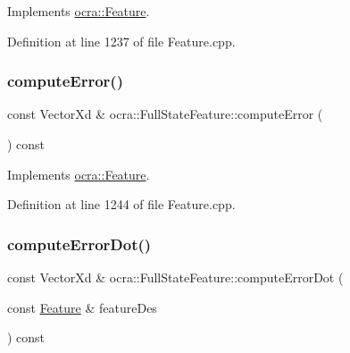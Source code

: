 Implements \hyperlink{classocra_1_1Feature_aaa74d6869f7e574fcc39d443581ddf77}{ocra\+::\+Feature}.



Definition at line 1237 of file Feature.\+cpp.

\hypertarget{classocra_1_1FullStateFeature_a8a8e1a72f3aa7b417b5d347eaee69ebb}{}\label{classocra_1_1FullStateFeature_a8a8e1a72f3aa7b417b5d347eaee69ebb} 
\subsubsection{\texorpdfstring{compute\+Error()}{computeError()}\hspace{0.1cm}{\footnotesize\ttfamily [2/2]}}
{\footnotesize\ttfamily const Vector\+Xd \& ocra\+::\+Full\+State\+Feature\+::compute\+Error (\begin{DoxyParamCaption}{ }\end{DoxyParamCaption}) const\hspace{0.3cm}{\ttfamily [virtual]}}



Implements \hyperlink{classocra_1_1Feature_a88f87b496aedc7bf9f13b19bb8f9c7fa}{ocra\+::\+Feature}.



Definition at line 1244 of file Feature.\+cpp.

\hypertarget{classocra_1_1FullStateFeature_a0d3e5b76bdcae8e06df07c7f525ad690}{}\label{classocra_1_1FullStateFeature_a0d3e5b76bdcae8e06df07c7f525ad690} 
\subsubsection{\texorpdfstring{compute\+Error\+Dot()}{computeErrorDot()}\hspace{0.1cm}{\footnotesize\ttfamily [1/2]}}
{\footnotesize\ttfamily const Vector\+Xd \& ocra\+::\+Full\+State\+Feature\+::compute\+Error\+Dot (\begin{DoxyParamCaption}\item[{const \hyperlink{classocra_1_1Feature}{Feature} \&}]{feature\+Des }\end{DoxyParamCaption}) const\hspace{0.3cm}{\ttfamily [virtual]}}



